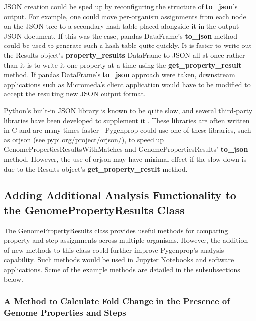 JSON creation could be sped up by reconfiguring the structure of \textbf{to\_json}'s output. For example, one could move per-organism assignments from each node on the JSON tree to a secondary hash table placed alongside it in the output JSON document. If this was the case, pandas DataFrame's \textbf{to\_json} method could be used to generate such a hash table quite quickly. It is faster to write out the Results object's \textbf{property\_results} DataFrame to JSON all at once rather than it is to write it one property at a time using the \textbf{get\_property\_result} method. If pandas DataFrame's \textbf{to\_json} approach were taken, downstream applications such as Micromeda's client application would have to be modified to accept the resulting new JSON output format.

Python's built-in JSON library is known to be quite slow, and several third-party libraries have been developed to supplement it \cite{krylysov_2015}. These libraries are often written in C and are many times faster \cite{krylysov_2015}. Pygenprop could use one of these libraries, such as orjson (see \href{pypi.org/project/orjson/}{pypi.org/project/orjson/}), to speed up GenomePropertiesResultsWithMatches and GenomePropertiesResults' \textbf{to\_json} method. However, the use of orjson may have minimal effect if the slow down is due to the Results object's \textbf{get\_property\_result} method.  

\subsection{Adding Additional Analysis Functionality to the GenomePropertyResults Class}

The GenomePropertyResults class provides useful methods for comparing property and step assignments across multiple organisms. However, the addition of new methods to this class could further improve Pygenprop's analysis capability. Such methods would be used in Jupyter Notebooks and software applications. Some of the example methods are detailed in the subsubsections below.

\subsubsection{A Method to Calculate Fold Change in the Presence of Genome Properties and Steps}

